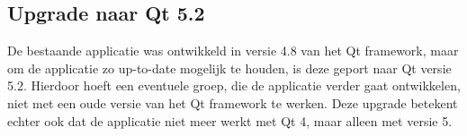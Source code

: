 \subsection{Upgrade naar Qt 5.2}
De bestaande applicatie was ontwikkeld in versie 4.8 van het Qt framework, maar om de applicatie zo up-to-date mogelijk te houden, is deze geport naar Qt versie 5.2. Hierdoor hoeft een eventuele groep, die de applicatie verder gaat ontwikkelen, niet met een oude versie van het Qt framework te werken. Deze upgrade betekent echter ook dat de applicatie niet meer werkt met Qt 4, maar alleen met versie 5.
